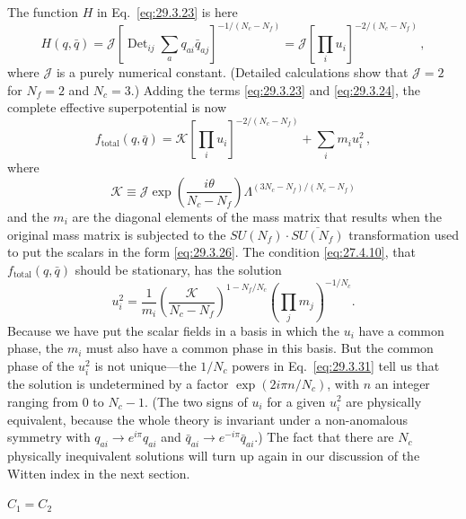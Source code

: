 The function \(H\) in Eq.~\eqref{eq:29.3.23} is here
\begin{equation}
  H(q,\bar q)
  =
  \mathcal{J}
  \left[
    \operatorname{Det}_{ij}\sum_a q_{ai}\bar q_{aj}
  \right]^{-1/(N_c-N_f)}
  =
  \mathcal{J}
  \left[\prod_i u_i\right]^{-2/(N_c-N_f)}\,,
  \tag{29.3.28}\label{eq:29.3.28}
\end{equation}
where \(\mathcal{J}\) is a purely numerical constant. (Detailed
calculations show that \(\mathcal{J}=2\) for \(N_f=2\) and \(N_c=3\).)
Adding the terms \eqref{eq:29.3.23} and \eqref{eq:29.3.24}, the complete
effective superpotential is now
\begin{equation}
  f_{\mathrm{total}}(q,\bar q)
  =
  \mathcal{K}
  \left[\prod_i u_i\right]^{-2/(N_c-N_f)}
  +\sum_i m_i u_i^2\,,
  \tag{29.3.29}\label{eq:29.3.29}
\end{equation}
where
\begin{equation}
  \mathcal{K}
  \equiv
  \mathcal{J}
  \exp\left(\frac{i\theta}{N_c-N_f}\right)
  \Lambda^{(3N_c-N_f)/(N_c-N_f)}
  \tag{29.3.30}\label{eq:29.3.30}
\end{equation}
and the \(m_i\) are the diagonal elements of the mass matrix that results
when the original mass matrix is subjected to the
\(SU(N_f)\mathbin{\cdot}\overline{SU(N_f)}\) transformation used to put
the scalars in the form \eqref{eq:29.3.26}. The condition
\eqref{eq:27.4.10}, that \(f_{\mathrm{total}}(q,\bar q)\) should be
stationary, has the solution
\begin{equation}
  u_i^2
  =
  \frac{1}{m_i}
  \left(\frac{\mathcal{K}}{N_c-N_f}\right)^{1-N_f/N_c}
  \left(\prod_j m_j\right)^{-1/N_c}.
  \tag{29.3.31}\label{eq:29.3.31}
\end{equation}
Because we have put the scalar fields in a basis in which the \(u_i\) have
a common phase, the \(m_i\) must also have a common phase in this basis.
But the common phase of the \(u_i^2\) is not unique---the \(1/N_c\) powers
in Eq.~\eqref{eq:29.3.31} tell us that the solution is undetermined by a
factor \(\exp(2i\pi n/N_c)\), with \(n\) an integer ranging from 0 to
\(N_c-1\). (The two signs of \(u_i\) for a given \(u_i^2\) are physically
equivalent, because the whole theory is invariant under a non-anomalous
symmetry with \(q_{ai}\longrightarrow e^{i\pi}q_{ai}\) and
\(\bar q_{ai}\longrightarrow e^{-i\pi}\bar q_{ai}\).) The fact that there
are \(N_c\) physically inequivalent solutions will turn up again in our
discussion of the Witten index in the next section.

\begin{center}
  \(C_1=C_2\)
\end{center}

